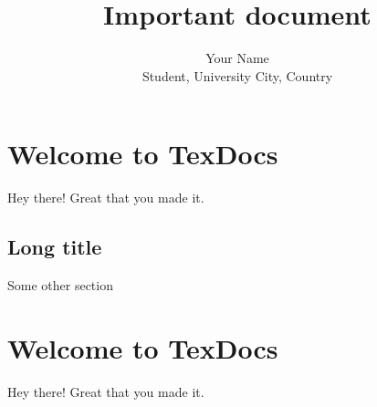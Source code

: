 \documentclass[a4paper]{article}
\title{Important document}
\author{Your Name\\ Student, University City, Country}
\begin{document}
	\maketitle
	\newpage

	\tableofcontents
	\newpage


	\section{Welcome to TexDocs}
	    Hey there! Great that you made it.

	    \subsection[Short title]{Long title}
	    	Some other section

	\section{Welcome to TexDocs}
	    Hey there! Great that you made it.
\end{document}
